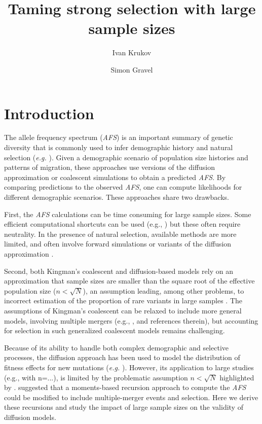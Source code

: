 \documentclass[9pt,twocolumn,twoside,lineno]{gsajnl}
\title{ Taming strong selection with large sample sizes }
\author[$\ast$]{Ivan Krukov}
\author[$\ast$]{Simon Gravel}
\affil[$\ast$]{Genome Center, Department of Human Genetics, McGill University, Montreal, Canada}
\begin{document}
\maketitle
\thispagestyle{firststyle}
\marginmark
\firstpagefootnote

\section{Introduction}
\label{sec_introduciton}

The allele frequency spectrum (\textit{AFS}) is an important summary of genetic diversity that is
commonly used to infer demographic history and natural selection (\textit{e.g.}
\cite{GutenkunstEtAl2009, KammEtAl2017, JouganousEtAl2017}). Given a demographic scenario of
population size histories and patterns of migration, these approaches use versions of the diffusion
approximation or coalescent simulations to obtain a predicted \textit{AFS}. By comparing
predictions to the observed \textit{AFS}, one can compute likelihoods for different demographic
scenarios. These approaches share two drawbacks.

First, the \textit{AFS} calculations can be time consuming for large sample sizes.  Some efficient
computational shortcuts can be used (e.g., \cite{fastsimcoal2, KammEtAl2017}) but these often
require neutrality.  In the presence of natural selection, available methods are more limited, and
often involve forward simulations or variants of the diffusion
approximation \citep{GutenkunstEtAl2009, JouganousEtAl2017}.

Second, both Kingman's coalescent and diffusion-based models rely on an approximation that sample
sizes are smaller than the square root of the effective population size ($n < \sqrt{N}$), an assumption leading, among other problems, to incorrect estimation of the proportion of rare variants in large samples \citep{Fu2006, BhaskarEtAl2014}. The assumptions of Kingman's coalescent can
be relaxed to include more general models, involving multiple mergers (e.g., \cite{Fu2006,
Spence2016}, and references therein), but accounting for selection in such generalized coalescent models 
remains challenging.

Because of its ability to handle both complex demographic and selective processes, the diffusion approach 
has been used to model the distribution of fitness effects for new
mutations (\textit{e.g.} \cite{EyreWalker2006, BoykoEtAl2008}). However, its application to large studies (e.g., \citep{karczewski2020mutational} with n=...), is limited by the problematic assumption $n < \sqrt{N}$ highlighted by \citep{Fu2006, BhaskarEtAl2014}. 
\cite{JouganousEtAl2017} suggested that a moments-based recursion approach to compute the
\textit{AFS} could be modified to include multiple-merger events and selection.  Here we derive
these recursions and study the impact of large sample sizes on the validity of diffusion models.
\end{document}
